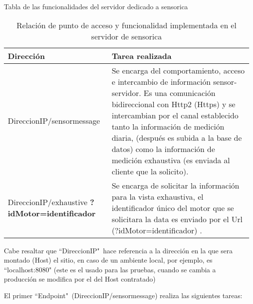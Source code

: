     \begin{table}[ht]
        \begin{center}
            Tabla de las funcionalidades del servidor dedicado a sensorica   \\

            \vspace{0.3cm}
            \begin{tabular}{|p{5cm}|p{10cm}|}
                \hline
                Dirección       & Tarea realizada
                \\\hline\hline
                DireccionIP/sensormessage &
                Se encarga del comportamiento, acceso
                e intercambio de información sensor-servidor. Es una comunicación
                bidireccional con Http2 (Https) y se intercambian por el canal
                establecido tanto la información de medición diaria, (después es
                subida a la base de datos) como la
                información de medición exhaustiva (es enviada al cliente que
                la solicito).

                \\\hline
                DireccionIP/exhaustive \textbf{?idMotor=identificador}   &
                Se encarga de solicitar la información para la vista exhaustiva,
                el identificador único del motor que se solicitara la data
                es enviado por el Url (?idMotor=identificador) .
                \\\hline
            \end{tabular}

            \vspace{0.3cm}
            Cabe resaltar que ``DireccionIP"\ hace referencia a la dirección en la
            que sera montado (Host) el sitio, en caso de un ambiente local, por
            ejemplo, es ``localhost:8080" (este es el usado para las pruebas,
            cuando se cambia a producción se modifica por el del Host contratado)
        \end{center}
        \caption[Funciones Servidor Sensorica]{ Relación de punto de acceso y
        funcionalidad implementada en el servidor de sensorica}
        \label{tab:ServerSensorica}
    \end{table}


    El primer ``Endpoint"\ (DireccionIP/sensormessage) realiza las siguientes tareas:

